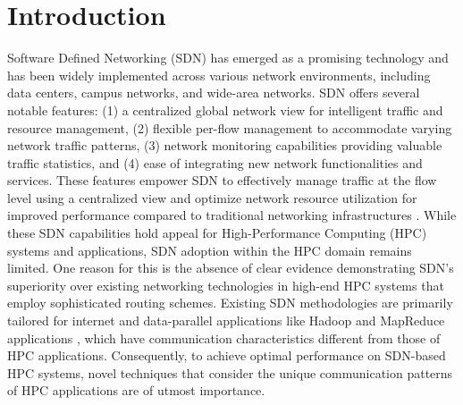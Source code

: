 \chapter{Introduction}

Software Defined Networking (SDN) \cite{kreutz2014software} has emerged as a promising technology and
has been widely implemented across various network environments, including data
centers, campus networks, and wide-area networks. SDN offers several notable
features: (1) a centralized global network view for intelligent traffic and
resource management, (2) flexible per-flow management to accommodate varying
network traffic patterns, (3) network monitoring capabilities providing valuable
traffic statistics, and (4) ease of integrating new network functionalities and
services. These features empower SDN to effectively manage traffic at the flow
level using a centralized view and optimize network resource utilization for
improved performance compared to traditional networking infrastructures \cite{tr2016sdn}.
While these SDN capabilities hold appeal for High-Performance Computing (HPC)
systems and applications, SDN adoption within the HPC domain remains limited.
One reason for this is the absence of clear evidence demonstrating SDN's
superiority over existing networking technologies in high-end HPC systems that
employ sophisticated routing schemes. Existing SDN methodologies are primarily
tailored for internet and data-parallel applications like Hadoop and MapReduce
applications \cite{he2016firebird}, which have communication characteristics different from those
of HPC applications. Consequently, to achieve optimal performance on SDN-based
HPC systems, novel techniques that consider the unique communication patterns of HPC
applications are of utmost importance. 

